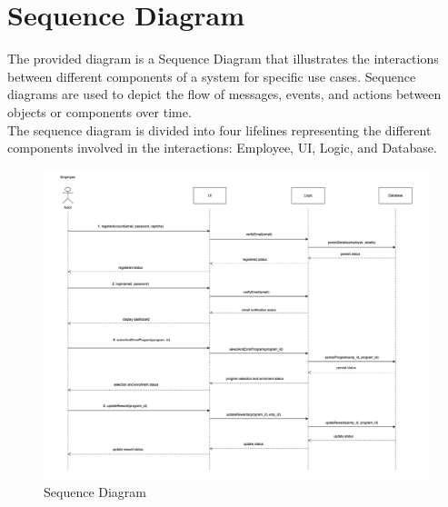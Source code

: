 \section{Sequence Diagram}
The provided diagram is a Sequence Diagram that illustrates the interactions between different components of a system for specific use cases. Sequence diagrams are used to depict the flow of messages, events, and actions between objects or components over time. 
\\
The sequence diagram is divided into four lifelines representing the different components involved in the interactions: Employee, UI, Logic, and Database. 
\begin{figure}[h!t]
    \centering
    \includegraphics[width=\textwidth]{images/sequenceDiagram.png}
    \caption{Sequence Diagram}
    \label{fig:sequenceDiagram}
\end{figure}

\FloatBarrier


